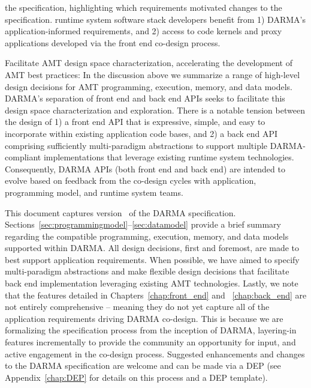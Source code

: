 \begin{compactdesc}
  the specification, highlighting which requirements motivated changes to the specification.
  \Gls{runtime system} software stack developers benefit 
  from 1) \gls{DARMA}’s application-informed requirements, and 2) access to code
  kernels and proxy applications developed via the \gls{front end}
  \gls{co-design} process.
\item[Facilitate AMT design space characterization, accelerating the
development of AMT best practices:]
  In the discussion above we summarize a range of high-level design decisions for
  \gls{AMT} programming, execution, memory, and data models. \gls{DARMA}'s
  separation of \gls{front end} and \gls{back end} \glspl{API} seeks to
  facilitate this design space characterization and exploration.  There 
  is a notable tension between the design of 1) a \gls{front end} \gls{API} that is expressive, simple, 
  and easy to incorporate within existing application code bases, and 2) a
  \gls{back end} \gls{API} comprising sufficiently multi-paradigm abstractions 
  to support multiple \gls{DARMA}-compliant implementations that leverage existing \gls{runtime
  system} technologies. 
  Consequently, \gls{DARMA} \gls{API}s (both \gls{front end} and \gls{back end}) are
  intended to evolve based on feedback from the \gls{co-design} cycles with 
  application, \gls{programming model}, and \gls{runtime system} teams. 
\end{compactdesc}


This document captures version \specVersion\ of the \gls{DARMA} specification. 
Sections~\ref{sec:programmingmodel}--\ref{sec:datamodel} provide a brief
summary regarding the compatible programming, execution, memory, and data
models supported within \gls{DARMA}. 
All design decisions, first and foremost, are made to best support application
requirements.  When possible, we have aimed to  
specify multi-paradigm abstractions and make flexible design decisions that
facilitate \gls{back end} implementation leveraging existing \gls{AMT}
technologies.  
Lastly, we note that the features detailed in Chapters~\ref{chap:front_end} and
~\ref{chap:back_end}  are not entirely comprehensive -- meaning they do not yet capture all of the
application requirements driving \gls{DARMA} \gls{co-design}.  This is because 
we are formalizing the specification process from the inception of \gls{DARMA}, layering-in features incrementally to
provide the community an opportunity for input, and active engagement in the
\gls{co-design} process.  Suggested enhancements and changes 
to the \gls{DARMA} specification are welcome and can be made via a \gls{DEP} (see
Appendix~\ref{chap:DEP} for details on this process and a \gls{DEP} template).



